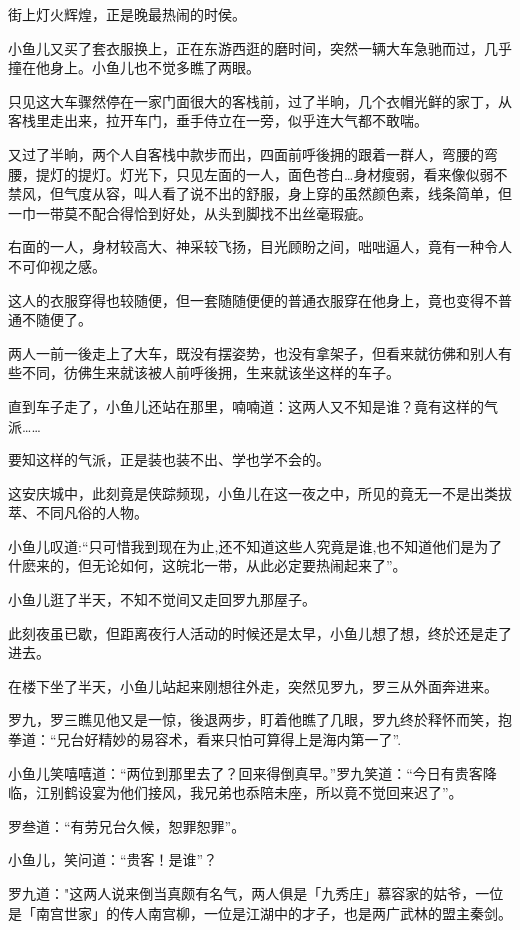 \documentclass[12pt,oneside]{book}
\begin{document}
街上灯火辉煌，正是晚最热闹的时侯。

小鱼儿又买了套衣服换上，正在东游西逛的磨时间，突然一辆大车急驰而过，几乎撞在他身上。小鱼儿也不觉多瞧了两眼。

只见这大车骤然停在一家门面很大的客栈前，过了半晌，几个衣帽光鲜的家丁，从客栈里走出来，拉开车门，垂手侍立在一旁，似乎连大气都不敢喘。

又过了半晌，两个人自客栈中款步而出，四面前呼後拥的跟着一群人，弯腰的弯腰，提灯的提灯。灯光下，只见左面的一人，面色苍白\ldots 身材瘦弱，看来像似弱不禁风，但气度从容，叫人看了说不出的舒服，身上穿的虽然颜色素，线条简单，但一巾一带莫不配合得恰到好处，从头到脚找不出丝毫瑕疵。

右面的一人，身材较高大、神采较飞扬，目光顾盼之间，咄咄逼人，竟有一种令人不可仰视之感。

这人的衣服穿得也较随便，但一套随随便便的普通衣服穿在他身上，竟也变得不普通不随便了。

两人一前一後走上了大车，既没有摆姿势，也没有拿架子，但看来就彷佛和别人有些不同，彷佛生来就该被人前呼後拥，生来就该坐这样的车子。

直到车子走了，小鱼儿还站在那里，喃喃道：这两人又不知是谁？竟有这样的气派\ldots\ldots{}

要知这样的气派，正是装也装不出、学也学不会的。

这安庆城中，此刻竟是侠踪频现，小鱼儿在这一夜之中，所见的竟无一不是出类拔萃、不同凡俗的人物。

小鱼儿叹道:``只可惜我到现在为止,还不知道这些人究竟是谁,也不知道他们是为了什麽来的，但无论如何，这皖北一带，从此必定要热闹起来了''。

小鱼儿逛了半天，不知不觉间又走回罗九那屋子。

此刻夜虽已歇，但距离夜行人活动的时候还是太早，小鱼儿想了想，终於还是走了进去。

在楼下坐了半天，小鱼儿站起来刚想往外走，突然见罗九，罗三从外面奔进来。

罗九，罗三瞧见他又是一惊，後退两步，盯着他瞧了几眼，罗九终於释怀而笑，抱拳道：``兄台好精妙的易容术，看来只怕可算得上是海内第一了''.

小鱼儿笑嘻嘻道：``两位到那里去了？回来得倒真早。''罗九笑道：``今日有贵客降临，江别鹤设宴为他们接风，我兄弟也忝陪未座，所以竟不觉回来迟了''。

罗叁道：``有劳兄台久候，恕罪恕罪''。

小鱼儿，笑问道：``贵客！是谁''？

罗九道："这两人说来倒当真颇有名气，两人俱是「九秀庄」慕容家的姑爷，一位是「南宫世家」的传人南宫柳，一位是江湖中的才子，也是两广武林的盟主秦剑。
\end{document}
